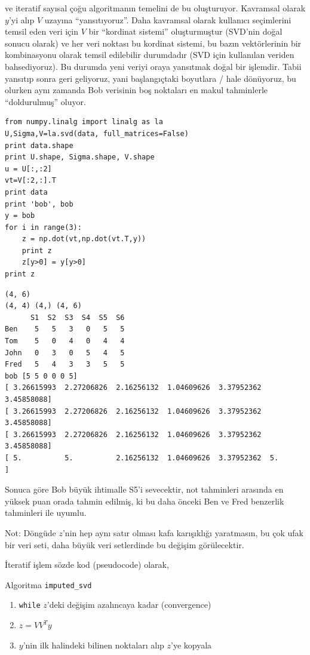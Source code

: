\documentclass[12pt,fleqn]{article}\usepackage{../../common}
\begin{document}
ve iteratif sayısal çoğu algoritmanın temelini de bu oluşturuyor. Kavramsal
olarak $y$'yi alıp $V$ uzayına ``yansıtıyoruz''. Daha kavramsal olarak kullanıcı
seçimlerini temsil eden veri için $V$ bir ``kordinat sistemi'' oluşturmuştur
(SVD'nin doğal sonucu olarak) ve her veri noktası bu kordinat sistemi, bu bazın
vektörlerinin bir kombinasyonu olarak temsil edilebilir durumdadır (SVD için
kullanılan veriden bahsediyoruz). Bu durumda yeni veriyi oraya yansıtmak doğal
bir işlemdir. Tabii yansıtıp sonra geri geliyoruz, yani başlangıçtaki boyutlara
/ hale dönüyoruz, bu olurken aynı zamanda Bob verisinin boş noktaları en makul
tahminlerle ``doldurulmuş'' oluyor.

\begin{verbatim}
from numpy.linalg import linalg as la
U,Sigma,V=la.svd(data, full_matrices=False)
print data.shape
print U.shape, Sigma.shape, V.shape
u = U[:,:2]
vt=V[:2,:].T
print data
print 'bob', bob
y = bob
for i in range(3):
    z = np.dot(vt,np.dot(vt.T,y))
    print z
    z[y>0] = y[y>0]
print z
\end{verbatim}

\begin{verbatim}
(4, 6)
(4, 4) (4,) (4, 6)
      S1  S2  S3  S4  S5  S6
Ben    5   5   3   0   5   5
Tom    5   0   4   0   4   4
John   0   3   0   5   4   5
Fred   5   4   3   3   5   5
bob [5 5 0 0 0 5]
[ 3.26615993  2.27206826  2.16256132  1.04609626  3.37952362  3.45858088]
[ 3.26615993  2.27206826  2.16256132  1.04609626  3.37952362  3.45858088]
[ 3.26615993  2.27206826  2.16256132  1.04609626  3.37952362  3.45858088]
[ 5.          5.          2.16256132  1.04609626  3.37952362  5.        ]
\end{verbatim}

Sonuca göre Bob büyük ihtimalle S5'i sevecektir, not tahminleri arasında en
yüksek puan orada tahmin edilmiş, ki bu daha önceki Ben ve Fred benzerlik
tahminleri ile uyumlu. 

Not: Döngüde $z$'nin hep aynı satır olması kafa karışıklığı yaratmasın, bu
çok ufak bir veri seti, daha büyük veri setlerdinde bu değişim
görülecektir. 

İteratif işlem sözde kod (pseudocode) olarak,

Algoritma \verb!imputed_svd!
\begin{enumerate}
  \item \verb!while! $z$'deki değişim azalıncaya kadar (convergence)
  \item $z = VV^Ty$ 
  \item  $y$'nin ilk halindeki bilinen noktaları alıp $z$'ye kopyala
\end{enumerate}
\end{document}
